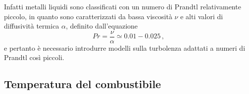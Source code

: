 Infatti metalli liquidi sono classificati con un numero di Prandtl relativamente 
piccolo, in quanto sono caratterizzati da bassa viscosità $\nu$ e alti valori di 
diffusività termica $\alpha$, definito dall'equazione
\begin{equation}
 Pr = \frac{\nu}{\alpha} \simeq 0.01-0.025 \,,
\end{equation}
e pertanto è necessario introdurre modelli sulla turbolenza adattati a numeri di Prandtl così piccoli.



\subsection{Temperatura del combustibile}


